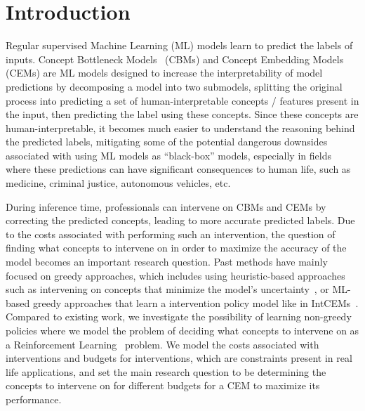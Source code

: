 \documentclass[../main.tex]{subfiles}
\begin{document}
\chapter{Introduction}
\label{firstcontentpage}


Regular supervised Machine Learning (ML) models learn to 
predict the labels of inputs.
Concept Bottleneck Models~\cite{cbm} (CBMs) and Concept Embedding Models~\cite{cem} (CEMs) are 
ML models designed to increase the interpretability of model predictions by decomposing a model into
two submodels, splitting the original process into predicting a set of human-interpretable
concepts / features present in the input, then predicting the label using these concepts.
Since these concepts are human-interpretable, it becomes much easier to understand
the reasoning behind the predicted labels, mitigating some of the
potential dangerous downsides associated with using ML models as ``black-box'' models,
especially in fields where these predictions can have significant consequences to
human life, such as medicine, criminal justice, autonomous vehicles, etc. 

During inference time, professionals can intervene on CBMs and CEMs by correcting
the predicted concepts, leading to more accurate predicted labels. 
Due to the costs
associated with performing such an intervention, the question of finding what concepts
to intervene on in order to maximize the accuracy of the model becomes an important 
research question. Past methods have mainly focused on greedy approaches, which
includes using heuristic-based approaches such as intervening on concepts that minimize the
model's uncertainty~\cite{coop}, or ML-based greedy approaches that learn a intervention policy model
like in IntCEMs~\cite{intcem}.
Compared to existing work, we investigate the possibility of learning non-greedy policies
where we model the problem of deciding what concepts to intervene on as a Reinforcement Learning~\cite{rl} 
problem. We model the costs
associated with interventions and budgets for interventions, which are constraints present in
 real life
applications, and set the main research question to be
determining the concepts to intervene on for different budgets for a CEM
to maximize its performance.
\end{document}
